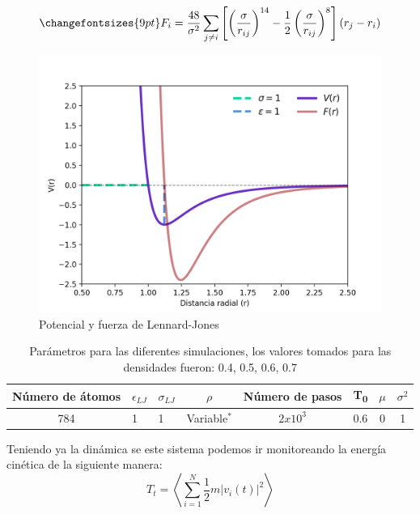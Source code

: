 \begin{equation}
    \changefontsizes{9pt}
    \label{eq:f-n}
    F_i = \frac{48}{\sigma^2} \sum_{j \ne i} \left[\left(\frac{\sigma}{r_{ij}}\right)^{14}-\frac{1}{2}\left(\frac{\sigma}{r_{ij}} \right)^8  \right] (r_j-r_i)
\end{equation}
\begin{figure}[H]
    \centering
    \includegraphics[scale=0.42]{../Graphics/Potencial.png}
    \caption{Potencial y fuerza de Lennard-Jones}
    \label{fig:pot-len-jones}
\end{figure}
\begin{table}
    \centering
    \begin{tabular}{cp{1cm}p{0.5cm}ccccc}
        \hline
        Número de átomos & $\epsilon_{LJ}$ & $\sigma_{LJ} $ & $\rho $ & Número de pasos & T\textsubscript{0} & $\mu$ &$\sigma^2$\\ \hline
        \multirow{2}{*}{784} &\multirow{2}{*}{1} &\multirow{2}{*}{1}  &\multirow{2}{*}{Variable$^{*}$}  &\multirow{2}{*}{$2x10^{3}$} & \multirow{2}{*}{0.6} & \multirow{2}{*}{0}  & \multirow{2}{*}{1}\\
          & & & & & \\ \hline
    \end{tabular}
    \caption{Parámetros para las diferentes simulaciones, los valores tomados para las densidades fueron: 0.4, 0.5, 0.6, 0.7}
    \label{table:parametros}
\end{table}
Teniendo ya la dinámica se este sistema podemos ir monitoreando la energía cinética de la siguiente manera:
\begin{equation}
    \label{eq:kin-n}
    T_t=\left\langle \sum_{i=1}^N \frac{1}{2}m|v_i(t)|^2\right\rangle
\end{equation}
